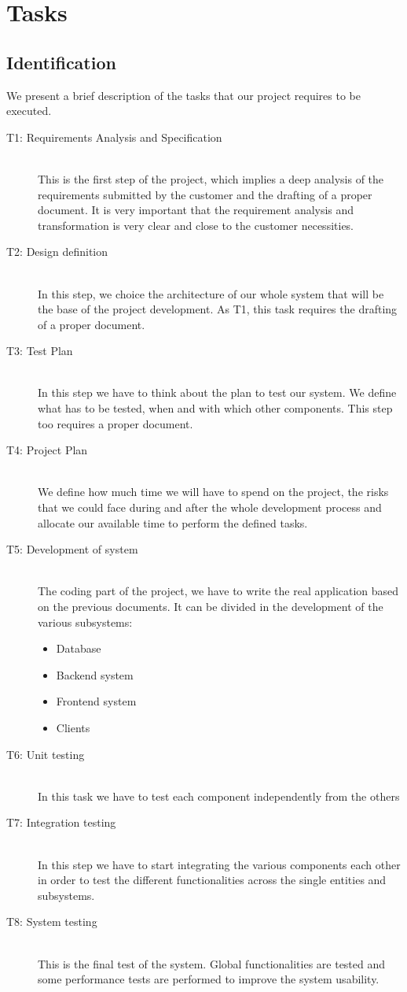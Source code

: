 \section{Tasks}
\subsection{Identification}
We present a brief description of the tasks that our project requires to be executed.
\begin{description}
	\item [T1: Requirements Analysis and Specification] \hfill \\
	This is the first step of the project, which implies a deep analysis of the requirements
	submitted by the customer and the drafting of a proper document. It is very important that
	the requirement analysis and transformation is very clear and close to the customer necessities.
	\item [T2: Design definition] \hfill \\
	In this step, we choice the architecture of our whole system that will be the base of the
	project development. As T1, this task requires the drafting of a proper document.
	\item [T3: Test Plan] \hfill \\
	In this step we have to think about the plan to test our system. We define what has to be tested,
	when and with which other components. This step too requires a proper document.
	\item [T4: Project Plan] \hfill \\
	We define how much time we will have to spend on the project, the risks that we could face during
	and after the whole development process and allocate our available time to perform the defined tasks.
	\item [T5: Development of system] \hfill \\
	The coding part of the project, we have to write the real application based on the previous documents.
	It can be divided in the development of the various subsystems:
	\begin{itemize}
		\item Database
		\item Backend system
		\item Frontend system
		\item Clients
	\end{itemize}
	\item [T6: Unit testing] \hfill \\
	In this task we have to test each component independently from the others
	\item [T7: Integration testing] \hfill \\
	In this step we have to start integrating the various components each other in order to test the
	different functionalities across the single entities and subsystems.
	\item [T8: System testing] \hfill \\
	This is the final test of the system. Global functionalities are tested and some performance tests
	are performed to improve the system usability.
\end{description}

